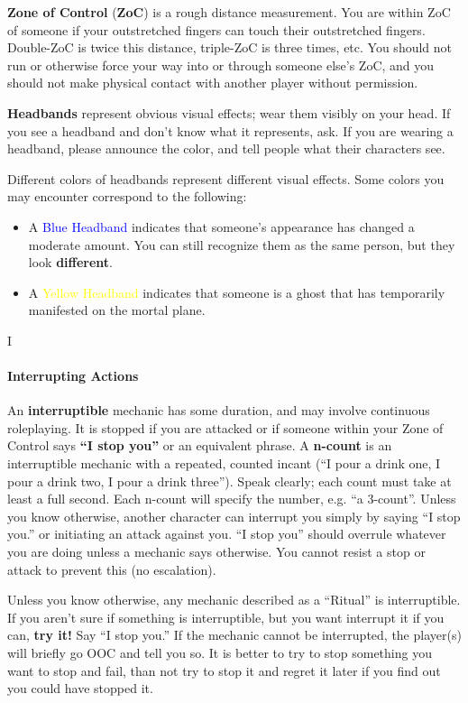 \documentclass[sheet]{GL2020}
\begin{document}
{\bf Zone of Control} ({\bf ZoC}) is a rough distance measurement. You are within ZoC of someone if your outstretched fingers can touch their outstretched fingers.  Double-ZoC is twice this distance, triple-ZoC is three times, etc. You should not run or otherwise force your way into or through someone else's ZoC, and you should not make physical contact with another player without permission.

{\bf Headbands} represent obvious visual effects; wear them visibly on your head. If you see a headband and don't know what it represents, ask. If you are wearing a headband, please announce the color, and tell people what their characters see.

Different colors of headbands represent different visual effects. Some colors you may encounter correspond to the following:
\begin{itemize}
	\item A \textcolor{blue}{Blue Headband} indicates that someone’s appearance has changed a moderate amount. You can still recognize them as the same person, but they look \textbf{different}.
	\item A \textcolor{yellow}{Yellow Headband} indicates that someone is a ghost that has temporarily manifested on the mortal plane.
\end{itemize}

I\paragraph{Interrupting Actions}An {\bf interruptible} mechanic has some duration, and may involve continuous roleplaying.  It is stopped if you are attacked or if someone within your Zone of Control  says {\bf ``I stop you''} or an equivalent phrase. A {\bf n-count} is an interruptible mechanic with a repeated, counted incant (``I pour a drink one, I pour a drink two, I pour a drink three'').  Speak clearly; each count must take at least a full second. Each n-count will specify the number, e.g. ``a 3-count''. Unless you know otherwise, another character can interrupt you simply by saying ``I stop you.'' or initiating an attack against you.  “I stop you” should overrule whatever you are doing unless a mechanic says otherwise.  You cannot resist a stop or attack to prevent this (no escalation).

Unless you know otherwise, any mechanic described as a ``Ritual'' is interruptible. If you aren't sure if something is interruptible, but you want interrupt it if you can, \textbf{try it!} Say ``I stop you.'' If the mechanic cannot be interrupted, the player(s) will briefly go OOC and tell you so. It is better to try to stop something you want to stop and fail, than not try to stop it and regret it later if you find out you could have stopped it.
\end{document}
